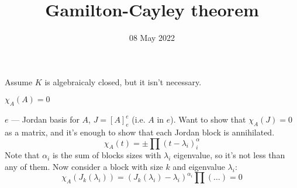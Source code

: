 
\title{Gamilton-Cayley theorem}
\author{}
\date{08 May 2022}

\maketitle

Assume $K$ is algebraicaly closed, but it isn't necessary.
\begin{thr} $\chi_A(A) = 0$ \end{thr}
$e$ --- Jordan basis for $A$, $J = [A]_e^e$ (i.e. $A$ in $e$).
Want to show that $\chi_A(J) = 0$ as a matrix, and it's enough to 
show that each Jordan block is annihilated.
\[ \chi_A(t) = \pm \prod (t - \lambda_i)^\alpha_i \]
Note that $\alpha_i$ is the sum of blocks sizes with $\lambda_i$ eigenvalue, so it's
not less than any of them.
Now consider a block with size $k$ and eigenvalue $\lambda_i$:
\[ \chi_A(J_k(\lambda_i)) = (J_k(\lambda_i) - \lambda_i)^{\alpha_i} \prod (\dots) = 0 \]
